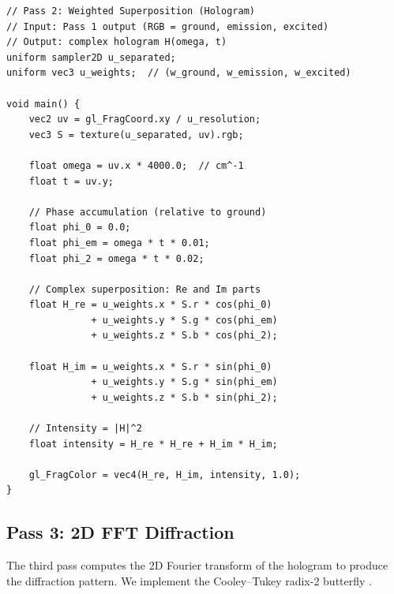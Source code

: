 \documentclass[11pt,twocolumn,a4paper]{article}
\theoremstyle{definition}
\theoremstyle{remark}
\begin{document}
\begin{lstlisting}[style=glsl, caption={Pass 2: Weighted superposition shader}, label={lst:pass2}]
// Pass 2: Weighted Superposition (Hologram)
// Input: Pass 1 output (RGB = ground, emission, excited)
// Output: complex hologram H(omega, t)
uniform sampler2D u_separated;
uniform vec3 u_weights;  // (w_ground, w_emission, w_excited)

void main() {
    vec2 uv = gl_FragCoord.xy / u_resolution;
    vec3 S = texture(u_separated, uv).rgb;

    float omega = uv.x * 4000.0;  // cm^-1
    float t = uv.y;

    // Phase accumulation (relative to ground)
    float phi_0 = 0.0;
    float phi_em = omega * t * 0.01;
    float phi_2 = omega * t * 0.02;

    // Complex superposition: Re and Im parts
    float H_re = u_weights.x * S.r * cos(phi_0)
               + u_weights.y * S.g * cos(phi_em)
               + u_weights.z * S.b * cos(phi_2);

    float H_im = u_weights.x * S.r * sin(phi_0)
               + u_weights.y * S.g * sin(phi_em)
               + u_weights.z * S.b * sin(phi_2);

    // Intensity = |H|^2
    float intensity = H_re * H_re + H_im * H_im;

    gl_FragColor = vec4(H_re, H_im, intensity, 1.0);
}
\end{lstlisting}

\subsection{Pass 3: 2D FFT Diffraction}

The third pass computes the 2D Fourier transform of the hologram to produce the diffraction pattern. We implement the Cooley--Tukey radix-2 butterfly \citep{cooleytukey1965}.
\end{document}
